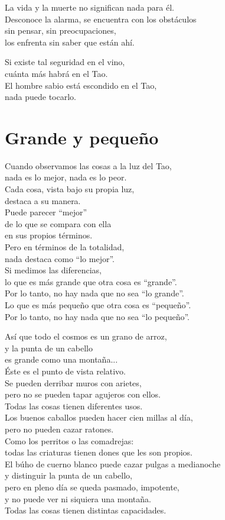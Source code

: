 \documentclass[book,b5paper,hidelinks,final]{memoir}
\begin{document}
	La vida y la muerte no significan nada para él.\\
	Desconoce la alarma, se encuentra con los obstáculos\\
	sin pensar, sin preocupaciones,\\
	los enfrenta sin saber que están ahí.
	
	Si existe tal seguridad en el vino,\\
	cuánta más habrá en el Tao.\\
	El hombre sabio está escondido en el Tao,\\
	nada puede tocarlo.
	
	\chapter*{Grande y pequeño}
	
	Cuando observamos las cosas a la luz del Tao,\\
	nada es lo mejor, nada es lo peor.\\
	Cada cosa, vista bajo su propia luz,\\
	destaca a su manera.\\
	Puede parecer ``mejor''\\
	de lo que se compara con ella\\
	en sus propios términos.\\
	Pero en términos de la totalidad,\\
	nada destaca como ``lo mejor''.\\
	Si medimos las diferencias,\\
	lo que es más grande que otra cosa es ``grande''.\\
	Por lo tanto, no hay nada que no sea ``lo grande''.\\
	Lo que es más pequeño que otra cosa es ``pequeño''.\\
	Por lo tanto, no hay nada que no sea ``lo pequeño''.
	
	Así que todo el cosmos es un grano de arroz,\\
	y la punta de un cabello\\
	es grande como una montaña...\\
	Éste es el punto de vista relativo.\\
	Se pueden derribar muros con arietes,\\
	pero no se pueden tapar agujeros con ellos.\\
	Todas las cosas tienen diferentes usos.\\
	Los buenos caballos pueden hacer cien millas al día,\\
	pero no pueden cazar ratones.\\
	Como los perritos o las comadrejas:\\
	todas las criaturas tienen dones que les son propios.\\
	El búho de cuerno blanco puede cazar pulgas a medianoche\\
	y distinguir la punta de un cabello,\\
	pero en pleno día se queda pasmado, impotente,\\
	y no puede ver ni siquiera una montaña.\\
	Todas las cosas tienen distintas capacidades.
	
\end{document}

